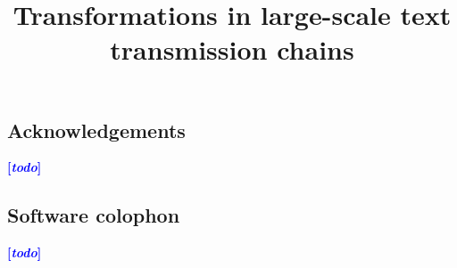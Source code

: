 \documentclass[jou]{apa6}
\title{Transformations in large-scale text transmission chains}
\date{}
\newcommand{\tb}[1]{\textcolor{blue}{#1}}
\newcommand{\rk}[1]{\tb{{\footnotesize {\bf[\emph{#1}]}}}}
\begin{document}
\maketitle







\subsection*{Acknowledgements}
\rk{todo}

\subsection*{Software colophon}
\rk{todo}


\printbibliography


\end{document}
